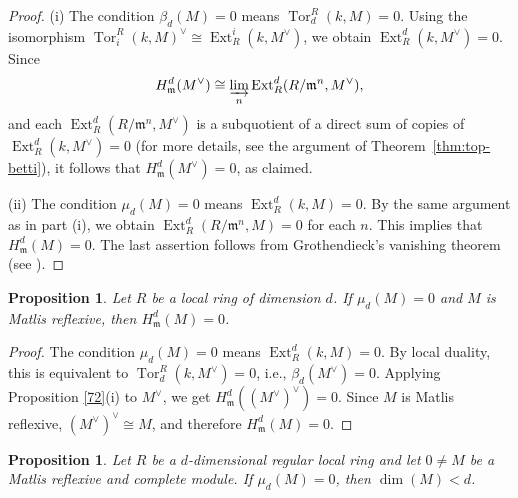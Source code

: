 \documentclass[11pt,a4paper]{amsart}
\numberwithin{equation}{section}
\newtheorem{proposition}[theorem]{Proposition}
\theoremstyle{definition}
\theoremstyle{remark}
\begin{document}
\begin{proof}
	(i) The condition $\beta_d(M) = 0$ means $\operatorname{Tor}_d^R(k,M) = 0$. Using the isomorphism $\operatorname{Tor}_i^R(k,M)^\vee \cong \operatorname{Ext}_R^i(k,M^\vee)$, we obtain $\operatorname{Ext}_R^d(k,M^\vee) = 0$. Since
	\[
	H^d_{\mathfrak{m}}(M^\vee) \cong \varinjlim_n \operatorname{Ext}_R^d(R/\mathfrak{m}^n, M^\vee),
	\]
	and each $\operatorname{Ext}_R^d(R/\mathfrak{m}^n, M^\vee)$ is a subquotient of a direct sum of copies of $\operatorname{Ext}_R^d(k, M^\vee) = 0$ (for more details, see the argument of Theorem~\ref{thm:top-betti}), it follows that $H^d_{\mathfrak{m}}(M^\vee) = 0$, as claimed.
	
	(ii) The condition $\mu_d(M) = 0$ means $\operatorname{Ext}_R^d(k, M) = 0$. By the same argument as in part (i), we obtain $\operatorname{Ext}_R^d(R/\mathfrak{m}^n, M) = 0$ for each $n$. This implies that $H^d_{\mathfrak{m}}(M) = 0$. The last assertion follows from Grothendieck's vanishing theorem (see \cite[6.1.2]{BSh}).
\end{proof}

\iffalse
\begin{proposition}
Let \(R\) be a local ring of dimension \(d\). If \(\mu_d(M)=0\) and \(M\) is Matlis reflexive, then \(H^d_{\mathfrak{m}}(M)=0\).
\end{proposition}

\begin{proof}
The condition \(\mu_d(M)=0\) means \(\operatorname{Ext}_R^d(k,M)=0\). By local duality, this is equivalent to \(\operatorname{Tor}_d^R(k,M^\vee)=0\), i.e., \(\beta_d(M^\vee)=0\). Applying {Proposition} \ref{72}(i) to \(M^\vee\), we get \(H^d_{\mathfrak{m}}((M^\vee)^\vee)=0\). Since \(M\) is Matlis reflexive, \((M^\vee)^\vee\cong M\), and therefore \(H^d_{\mathfrak{m}}(M)=0\).
\end{proof}



\begin{proposition}
Let \(R\) be a \(d\)-dimensional regular local ring and let \(0\neq M\) be a Matlis reflexive and complete module. If \(\mu_d(M)=0\), then \(\dim(M)<d\).
\end{proposition}
\end{document}

